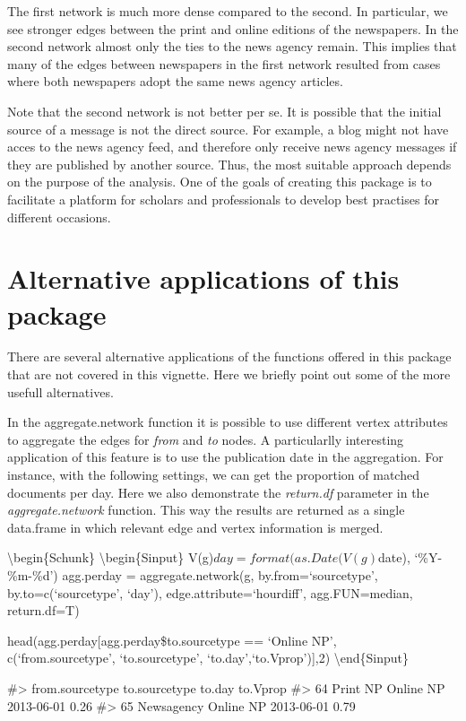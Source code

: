 The first network is much more dense compared to the second. In
particular, we see stronger edges between the print and online editions
of the newspapers. In the second network almost only the ties to the
news agency remain. This implies that many of the edges between
newspapers in the first network resulted from cases where both
newspapers adopt the same news agency articles.

Note that the second network is not better per se. It is possible that
the initial source of a message is not the direct source. For example, a
blog might not have acces to the news agency feed, and therefore only
receive news agency messages if they are published by another source.
Thus, the most suitable approach depends on the purpose of the analysis.
One of the goals of creating this package is to facilitate a platform
for scholars and professionals to develop best practises for different
occasions.

\section{Alternative applications of this package}

There are several alternative applications of the functions offered in
this package that are not covered in this vignette. Here we briefly
point out some of the more usefull alternatives.

In the aggregate.network function it is possible to use different vertex
attributes to aggregate the edges for \emph{from} and \emph{to} nodes. A
particularlly interesting application of this feature is to use the
publication date in the aggregation. For instance, with the following
settings, we can get the proportion of matched documents per day. Here
we also demonstrate the \emph{return.df} parameter in the
\emph{aggregate.network} function. This way the results are returned as
a single data.frame in which relevant edge and vertex information is
merged.

\textbackslash{}begin\{Schunk\} \textbackslash{}begin\{Sinput\}
V(g)\(day = format(as.Date(V(g)\)date), `\%Y-\%m-\%d') agg.perday =
aggregate.network(g, by.from=`sourcetype', by.to=c(`sourcetype', `day'),
edge.attribute=`hourdiff', agg.FUN=median, return.df=T)

head(agg.perday{[}agg.perday\$to.sourcetype == `Online NP',\\
c(`from.sourcetype', `to.sourcetype', `to.day',`to.Vprop'){]},2)
\textbackslash{}end\{Sinput\}

\begin{Soutput}
#>    from.sourcetype to.sourcetype     to.day to.Vprop
#> 64        Print NP     Online NP 2013-06-01     0.26
#> 65      Newsagency     Online NP 2013-06-01     0.79
\end{Soutput}

